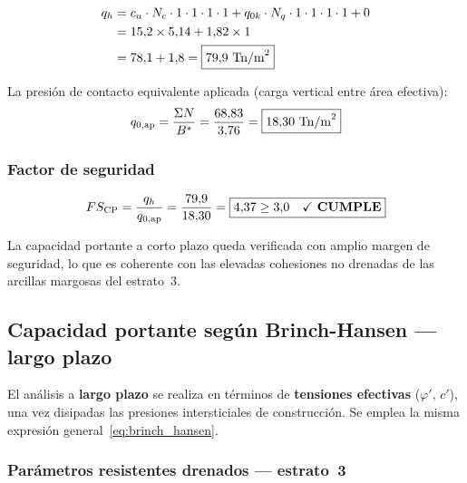 \begin{align}
  q_h &= c_u \cdot N_c \cdot 1 \cdot 1 \cdot 1 \cdot 1
        + q_{0k} \cdot N_q \cdot 1 \cdot 1 \cdot 1 \cdot 1
        + 0 \nonumber \\
      &= 15{,}2 \times 5{,}14 + 1{,}82 \times 1 \nonumber \\
      &= 78{,}1 + 1{,}8
       = \boxed{79{,}9~\text{Tn/m}^2}
  \label{eq:qh_CP}
\end{align}

La presión de contacto equivalente aplicada (carga vertical entre área efectiva):
\begin{equation}
  q_{0,\text{ap}} = \frac{\Sigma N}{B^*}
                  = \frac{68{,}83}{3{,}76}
                  = \boxed{18{,}30~\text{Tn/m}^2}
  \label{eq:q_aplicada}
\end{equation}

\subsubsection{Factor de seguridad}

\begin{equation}
  FS_\text{CP} = \frac{q_h}{q_{0,\text{ap}}}
               = \frac{79{,}9}{18{,}30}
               = \boxed{4{,}37 \geq 3{,}0 \quad \checkmark~\textbf{CUMPLE}}
  \label{eq:fs_hundimiento_CP}
\end{equation}

La capacidad portante a corto plazo queda verificada con amplio margen de
seguridad, lo que es coherente con las elevadas cohesiones no drenadas de las
arcillas margosas del estrato~3.

\subsection{Capacidad portante según Brinch-Hansen — largo plazo}
\label{subsec:hundimiento_brinch_LP}

El análisis a \textbf{largo plazo} se realiza en términos de \textbf{tensiones
efectivas} ($\varphi',\,c'$), una vez disipadas las presiones intersticiales de
construcción. Se emplea la misma expresión general~\eqref{eq:brinch_hansen}.

\subsubsection{Parámetros resistentes drenados — estrato~3}

